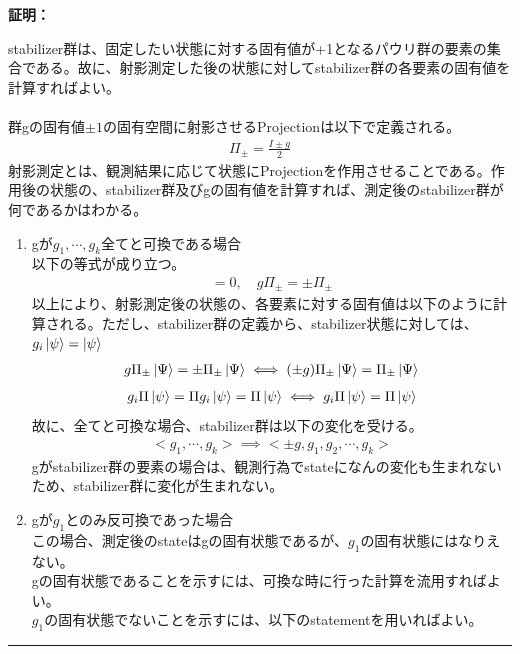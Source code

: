 \documentclass[a4paper,10.5pt]{article}
\numberwithin{equation}{section}
\newenvironment{proofbox}
{\begin{prooflabel}\textbf{証明：}\end{prooflabel}\vspace{0.8em}}
{\par\vspace{1em}\hrule\vspace{1em}}
\begin{document}
\begin{proofbox}
    stabilizer群は、固定したい状態に対する固有値が+1となるパウリ群の要素の集合である。故に、射影測定した後の状態に対してstabilizer群の各要素の固有値を計算すればよい。\\
    \\
    群gの固有値$\pm1$の固有空間に射影させるProjectionは以下で定義される。\\
    \begin{align*}
        \Pi_{\pm}=\frac{I\pm g}{2}
    \end{align*}
    射影測定とは、観測結果に応じて状態にProjectionを作用させることである。作用後の状態の、stabilizer群及びgの固有値を計算すれば、測定後のstabilizer群が何であるかはわかる。
   \begin{enumerate}
       \item gが$g_{1},\cdots ,g_{k}$全てと可換である場合\\
       以下の等式が成り立つ。
       \begin{align*}
           [\Pi_{\pm},g_{i}]=0,\quad g\Pi_{\pm}=\pm \Pi_{\pm}
       \end{align*}
       以上により、射影測定後の状態の、各要素に対する固有値は以下のように計算される。ただし、stabilizer群の定義から、stabilizer状態に対しては、$g_{i}\ket{\psi}=\ket{\psi}$
       \begin{align*}
           g\Pi_{\pm}\ket{\Psi}=\pm\Pi_{\pm}\ket{\Psi} \iff (\pm g)\Pi_{\pm}\ket{\Psi}=\Pi_{\pm}\ket{\Psi}
       \end{align*}
       \begin{align*}
           g_{i}\Pi\ket{\psi}=\Pi g_{i}\ket{\psi}=\Pi\ket{\psi}\iff g_{i}\Pi\ket{\psi}=\Pi \ket{\psi}
       \end{align*}
       故に、全てと可換な場合、stabilizer群は以下の変化を受ける。
       \begin{align*}
        <g_{1},\cdots ,g_{k}> \implies <\pm g,g_{1},g_{2},\cdots ,g_{k}>
    \end{align*}
    gがstabilizer群の要素の場合は、観測行為でstateになんの変化も生まれないため、stabilizer群に変化が生まれない。
    \item gが$g_{1}$とのみ反可換であった場合\\
    この場合、測定後のstateはgの固有状態であるが、$g_{1}$の固有状態にはなりえない。\\
    gの固有状態であることを示すには、可換な時に行った計算を流用すればよい。\\
    $g_{1}$の固有状態でないことを示すには、以下のstatementを用いればよい。

\end{enumerate}
\end{proofbox}
\end{document}
